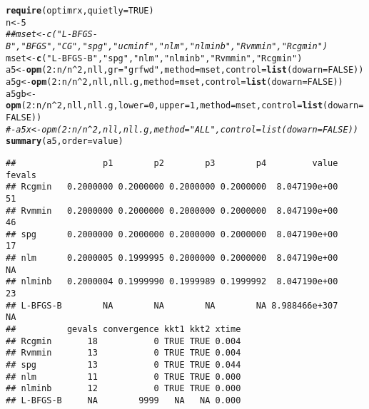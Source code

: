 \documentclass[11pt]{article}\usepackage[]{graphicx}\usepackage[]{color}
\makeatletter
\newcommand{\hlnum}[1]{\textcolor[rgb]{0.686,0.059,0.569}{#1}}%
\newcommand{\hlstr}[1]{\textcolor[rgb]{0.192,0.494,0.8}{#1}}%
\newcommand{\hlcom}[1]{\textcolor[rgb]{0.678,0.584,0.686}{\textit{#1}}}%
\newcommand{\hlopt}[1]{\textcolor[rgb]{0,0,0}{#1}}%
\newcommand{\hlstd}[1]{\textcolor[rgb]{0.345,0.345,0.345}{#1}}%
\newcommand{\hlkwb}[1]{\textcolor[rgb]{0.69,0.353,0.396}{#1}}%
\newcommand{\hlkwc}[1]{\textcolor[rgb]{0.333,0.667,0.333}{#1}}%
\newcommand{\hlkwd}[1]{\textcolor[rgb]{0.737,0.353,0.396}{\textbf{#1}}}%
\newenvironment{kframe}{%
 \def\at@end@of@kframe{}%
 \ifinner\ifhmode%
  \def\at@end@of@kframe{\end{minipage}}%
  \begin{minipage}{\columnwidth}%
 \fi\fi%
 \def\FrameCommand##1{\hskip\@totalleftmargin \hskip-\fboxsep
 \colorbox{shadecolor}{##1}\hskip-\fboxsep
     \hskip-\linewidth \hskip-\@totalleftmargin \hskip\columnwidth}%
 \MakeFramed {\advance\hsize-\width
   \@totalleftmargin\z@ \linewidth\hsize
   \@setminipage}}%
 {\par\unskip\endMakeFramed%
 \at@end@of@kframe}
\newenvironment{knitrout}{}{} %
\makeatother
\begin{document}
\begin{knitrout}\scriptsize
{}\color{fgcolor}\begin{kframe}
\begin{alltt}
\hlkwd{require}\hlstd{(optimrx,} \hlkwc{quietly}\hlstd{=}\hlnum{TRUE}\hlstd{)}
\hlstd{n}\hlkwb{<-}\hlnum{5}
\hlcom{## mset<-c("L-BFGS-B", "BFGS", "CG", "spg", "ucminf", "nlm", "nlminb", "Rvmmin", "Rcgmin")}
\hlstd{mset}\hlkwb{<-}\hlkwd{c}\hlstd{(}\hlstr{"L-BFGS-B"}\hlstd{,} \hlstr{"spg"}\hlstd{,} \hlstr{"nlm"}\hlstd{,} \hlstr{"nlminb"}\hlstd{,} \hlstr{"Rvmmin"}\hlstd{,} \hlstr{"Rcgmin"}\hlstd{)}
\hlstd{a5}\hlkwb{<-}\hlkwd{opm}\hlstd{(}\hlnum{2}\hlopt{:}\hlstd{n}\hlopt{/}\hlstd{n}\hlopt{^}\hlnum{2}\hlstd{, nll,} \hlkwc{gr}\hlstd{=}\hlstr{"grfwd"}\hlstd{,} \hlkwc{method}\hlstd{=mset,} \hlkwc{control}\hlstd{=}\hlkwd{list}\hlstd{(}\hlkwc{dowarn}\hlstd{=}\hlnum{FALSE}\hlstd{))}
\hlstd{a5g}\hlkwb{<-}\hlkwd{opm}\hlstd{(}\hlnum{2}\hlopt{:}\hlstd{n}\hlopt{/}\hlstd{n}\hlopt{^}\hlnum{2}\hlstd{, nll, nll.g,} \hlkwc{method}\hlstd{=mset,} \hlkwc{control}\hlstd{=}\hlkwd{list}\hlstd{(}\hlkwc{dowarn}\hlstd{=}\hlnum{FALSE}\hlstd{))}
\hlstd{a5gb}\hlkwb{<-}\hlkwd{opm}\hlstd{(}\hlnum{2}\hlopt{:}\hlstd{n}\hlopt{/}\hlstd{n}\hlopt{^}\hlnum{2}\hlstd{, nll, nll.g,} \hlkwc{lower}\hlstd{=}\hlnum{0}\hlstd{,} \hlkwc{upper}\hlstd{=}\hlnum{1}\hlstd{,} \hlkwc{method}\hlstd{=mset,} \hlkwc{control}\hlstd{=}\hlkwd{list}\hlstd{(}\hlkwc{dowarn}\hlstd{=}\hlnum{FALSE}\hlstd{))}
\hlcom{#- a5x <- opm(2:n/n^2, nll, nll.g, method="ALL", control=list(dowarn=FALSE))}
\hlkwd{summary}\hlstd{(a5,}\hlkwc{order}\hlstd{=value)}
\end{alltt}
\begin{verbatim}
##                 p1        p2        p3        p4         value fevals
## Rcgmin   0.2000000 0.2000000 0.2000000 0.2000000  8.047190e+00     51
## Rvmmin   0.2000000 0.2000000 0.2000000 0.2000000  8.047190e+00     46
## spg      0.2000000 0.2000000 0.2000000 0.2000000  8.047190e+00     17
## nlm      0.2000005 0.1999995 0.2000000 0.2000000  8.047190e+00     NA
## nlminb   0.2000004 0.1999990 0.1999989 0.1999992  8.047190e+00     23
## L-BFGS-B        NA        NA        NA        NA 8.988466e+307     NA
##          gevals convergence kkt1 kkt2 xtime
## Rcgmin       18           0 TRUE TRUE 0.004
## Rvmmin       13           0 TRUE TRUE 0.004
## spg          13           0 TRUE TRUE 0.044
## nlm          11           0 TRUE TRUE 0.000
## nlminb       12           0 TRUE TRUE 0.000
## L-BFGS-B     NA        9999   NA   NA 0.000
\end{verbatim}

\end{kframe}
\end{knitrout}
\end{document}
